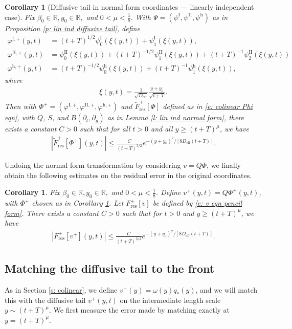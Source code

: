 \documentclass[11pt]{article}
\newcommand{\R}{\mathbb{R}}
\renewcommand{\phi}{\varphi}
\newtheorem{corollary}[prop]{Corollary}
\numberwithin{equation}{section}
\numberwithin{prop}{section}
\newcommand{\psih}{\psi^\mathrm{h}}
\newcommand{\Deff}{D_\mathrm{eff}}
\newcommand{\phihp}{\phi^\mathrm{h, +}}
\newcommand{\phiIp}{\phi^{\mathrm{I},+}}
\newcommand{\psiI}{\psi^\mathrm{I}}
\newcommand{\psiII}{\psi^\mathrm{II}}
\newcommand{\phiIIp}{\phi^{\mathrm{II},+}}
\begin{document}
\begin{corollary}[Diffusive tail in normal form coordinates --- linearly independent case]\label{c: lin ind diffusive tail normal form}
	Fix $\beta_0 \in \R, y_0 \in \R,$ and $0 < \mu < \frac{1}{8}$. With $\Psi = (\psiI, \psiII, \psih)$ as in Proposition \ref{p: lin ind diffusive tail}, define 
	\begin{align}
	\phiIp (y,t) &= (t+T)^{1/2} \psiI_0 \left( \xi(y,t)  \right) + \psiI_1 \left( \xi(y,t) \right), \\
	\phiIIp (y,t) &= \psiII_0 \left( \xi(y,t)  \right) + (t+T)^{-1/2} \psiII_1 \left( \xi(y,t)  \right)  + (t+T)^{-1} \psiII_2 \left( \xi(y,t) \right)  \\
	\phihp(y,t) &= (t+T)^{-1/2} \psih_0 \left( \xi(y,t) \right)  + (t+T)^{-1} \psih_1\left( \xi(y,t) \right),
	\end{align}
	where 
	\begin{align}
	\xi(y,t) =  \frac{1}{\sqrt{\Deff}} \frac{y+y_0}{\sqrt{t+T}}. 
	\end{align}
	Then with $\Phi^+ = (\phiIp, \phiIIp, \phihp)$ and $\tilde{F}^+_\mathrm{res} [\Phi]$ defined as in \eqref{e: colinear Phi eqn}, with $Q$, $S$, and $B(\partial_t, \partial_y)$ as in Lemma \ref{l: lin ind normal form}, there exists a constant $C > 0$ such that for all $t > 0$ and all $y \geq (t+T)^\mu$, we have 
	\begin{align}
	| \tilde{F}^+_\mathrm{res} [\Phi^+](y,t)| \leq \frac{C}{(t+T)^{3/2}} e^{-(y+y_0)^2/[8 \Deff (t+T)]}. 
	\end{align}
\end{corollary}
Undoing the normal form transformation by considering $v = Q \Phi$, we finally obtain the following estimates on the residual error in the original coordinates.
\begin{corollary}\label{c: lin ind diffusive tail original coordinates}
	Fix $\beta_0 \in \R, y_0 \in \R,$ and $0 < \mu < \frac{1}{8}$. Define $v^+(y,t) = Q \Phi^+(y,t)$, with $\Phi^+$ chosen as in Corollary \ref{c: lin ind diffusive tail normal form}. Let $F^+_\mathrm{res} [v]$ be defined by \eqref{e: v eqn pencil form}. There exists a constant $C > 0$ such that for $t > 0$ and $y \geq (t+T)^\mu$, we have 
	\begin{align}
	| F^+_\mathrm{res} [v^+](y,t) | \leq \frac{C}{(t+T)^{3/2}} e^{-(y+y_0)^2/[8 \Deff (t+T)]}. 
	\end{align}
\end{corollary}

\subsection{Matching the diffusive tail to the front}
As in Section \ref{s: colinear}, we define $v^-(y) = \omega(y) q_*(y)$, and we will match this with the diffusive tail $v^+(y,t)$ on the intermediate length scale $y \sim (t+T)^\mu$. We first measure the error made by matching exactly at $y = (t+T)^\mu$.
\end{document}
